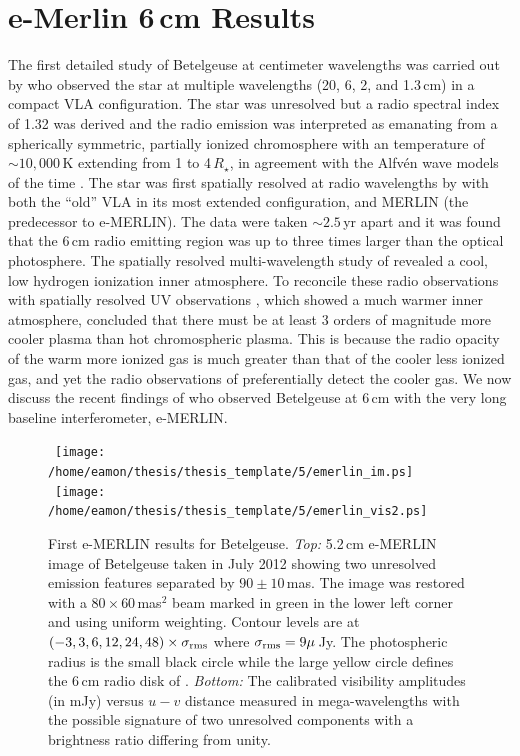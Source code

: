 \section{e-Merlin 6\,cm Results}\label{sec:5.12}
The first detailed study of Betelgeuse at centimeter wavelengths was carried out by \cite{newell_1982}
who observed the star at multiple wavelengths (20, 6, 2, and 1.3\,cm) in a compact VLA configuration. The star was unresolved but a radio spectral index of 1.32 was derived and the radio emission was interpreted as emanating from a spherically symmetric, partially ionized chromosphere with an temperature of  $\sim 10,000$\,K extending from 1 to 4\,$R_{\star}$, in agreement with the Alfv\'en wave models of the time \citep{hartmann_1984}. The star was first spatially resolved at radio wavelengths by \cite{skinner_1997} with both the ``old'' VLA in its most extended configuration, and MERLIN (the predecessor to e-MERLIN). The data were taken $\sim 2.5$\,yr apart and it was found that the 6\,cm radio emitting region was up to three times larger than the optical photosphere. The spatially resolved multi-wavelength study of \cite{lim_1998} revealed a cool, low hydrogen ionization inner atmosphere. To reconcile these radio observations with spatially resolved UV observations \cite{gilliland_1996}, which showed a much warmer inner atmosphere, \cite{lim_1998} concluded that there must be at least 3 orders of magnitude more cooler plasma than hot chromospheric plasma. This is because the radio opacity of the warm more ionized gas is much greater than that of the cooler less ionized gas, and yet the radio observations of \cite{lim_1998} preferentially detect the cooler gas. We now discuss the recent findings of \cite{richards_2013} who observed Betelgeuse at 6\,cm with the very long baseline interferometer, e-MERLIN.

\begin{figure}[!ht]
\centering 
\mbox{
          \texttt{[image: /home/eamon/thesis/thesis\_template/5/emerlin\_im.ps]}
           }
\mbox{           
          \texttt{[image: /home/eamon/thesis/thesis\_template/5/emerlin\_vis2.ps]}
          }
\caption[First e-MERLIN results for Betelgeuse]{First e-MERLIN results for Betelgeuse. \textit{Top:} 5.2\,cm e-MERLIN image of Betelgeuse taken in July 2012 showing two unresolved emission features separated by $90\pm10$\,mas. The image was restored with a $80\times 60$\,mas$^2$ beam marked in green in the lower left corner and using uniform weighting. Contour levels are at $(-3, 3, 6, 12, 24, 48)\times \sigma _{\rm{rms}}$ where $\sigma _{\rm{rms}} = 9\mu$\,Jy. The photospheric radius is the small black circle while the large yellow circle defines the 6\,cm radio disk of \cite{lim_1998}. \textit{Bottom:} The calibrated visibility amplitudes (in mJy) versus $u-v$ distance measured in mega-wavelengths with the possible signature of two unresolved components with a brightness ratio differing from unity. }
\label{fig:5.13}
\end{figure}

